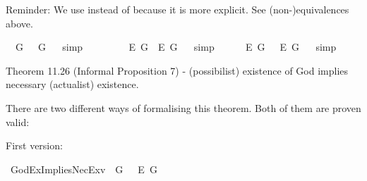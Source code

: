 \begin{isabellebody}
%
\endisadelimproof
%
\begin{isamarkuptext}%
Reminder: We use  instead of  because it is more explicit. See (non-)equivalences above.%
\end{isamarkuptext}\isamarkuptrue%
\isamarkupfalse%
\ {\isachardoublequoteopen}{\isasymlfloor}\isactrlbold {\isasymexists}\ G\ \isactrlbold {\isasymleftrightarrow}\ \isactrlbold {\isasymexists}\ \isactrlbold {\isasymdown}G{\isasymrfloor}{\isachardoublequoteclose}%
\isadelimproof
\ %
\endisadelimproof
%
\isatagproof
{}\isamarkupfalse%
\ simp%
\endisatagproof
{\isafoldproof}%
%
\isadelimproof
%
\endisadelimproof
\ \ \ \ \ \ \ \isanewline
{}\isamarkupfalse%
\ {\isachardoublequoteopen}{\isasymlfloor}\isactrlbold {\isasymexists}\isactrlsup E\ G\ \isactrlbold {\isasymleftrightarrow}\ \isactrlbold {\isasymexists}\isactrlsup E\ \isactrlbold {\isasymdown}G{\isasymrfloor}{\isachardoublequoteclose}%
\isadelimproof
\ %
\endisadelimproof
%
\isatagproof
{}\isamarkupfalse%
\ simp%
\endisatagproof
{\isafoldproof}%
%
\isadelimproof
%
\endisadelimproof
\ \ \ \ \isanewline
{}\isamarkupfalse%
\ {\isachardoublequoteopen}{\isasymlfloor}\isactrlbold {\isasymbox}\isactrlbold {\isasymexists}\isactrlsup E\ G\ \isactrlbold {\isasymleftrightarrow}\ \ \isactrlbold {\isasymbox}\isactrlbold {\isasymexists}\isactrlsup E\ \isactrlbold {\isasymdown}G{\isasymrfloor}{\isachardoublequoteclose}%
\isadelimproof
\ %
\endisadelimproof
%
\isatagproof
{}\isamarkupfalse%
\ simp%
\endisatagproof
{\isafoldproof}%
%
\isadelimproof
%
\endisadelimproof
%
\begin{isamarkuptext}%
Theorem 11.26 (Informal Proposition 7) - (possibilist) existence of God implies necessary (actualist) existence.%
\end{isamarkuptext}\isamarkuptrue%
%
\begin{isamarkuptext}%
There are two different ways of formalising this theorem. Both of them are proven valid:%
\end{isamarkuptext}\isamarkuptrue%
%
\begin{isamarkuptext}%
First version:%
\end{isamarkuptext}\isamarkuptrue%
\isamarkupfalse%
\ GodExImpliesNecEx{\isacharunderscore}v{}{\isacharcolon}\ {\isachardoublequoteopen}{\isasymlfloor}\isactrlbold {\isasymexists}\ \isactrlbold {\isasymdown}G\ \isactrlbold {\isasymrightarrow}\ \ \isactrlbold {\isasymbox}\isactrlbold {\isasymexists}\isactrlsup E\ \isactrlbold {\isasymdown}G{\isasymrfloor}{\isachardoublequoteclose}\ \isanewline

\end{isabellebody}
